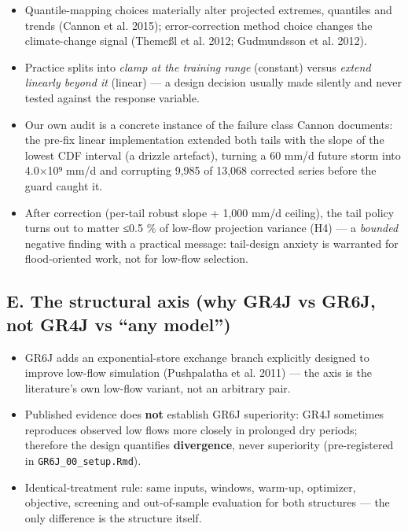 \documentclass[
  11pt,
]{article}
\providecommand{\tightlist}{%
  \setlength{\itemsep}{0pt}\setlength{\parskip}{0pt}}
\begin{document}
\begin{itemize}
\tightlist
\item
  Quantile-mapping choices materially alter projected extremes,
  quantiles and trends (Cannon et al. 2015); error-correction method
  choice changes the climate-change signal (Themeßl et al. 2012;
  Gudmundsson et al. 2012).
\item
  Practice splits into \emph{clamp at the training range} (constant)
  versus \emph{extend linearly beyond it} (linear) --- a design decision
  usually made silently and never tested against the response variable.
\item
  Our own audit is a concrete instance of the failure class Cannon
  documents: the pre-fix linear implementation extended both tails with
  the slope of the lowest CDF interval (a drizzle artefact), turning a
  60 mm/d future storm into 4.0×10⁹ mm/d and corrupting 9,985 of 13,068
  corrected series before the guard caught it.
\item
  After correction (per-tail robust slope + 1,000 mm/d ceiling), the
  tail policy turns out to matter ≤0.5 \% of low-flow projection
  variance (H4) --- a \emph{bounded} negative finding with a practical
  message: tail-design anxiety is warranted for flood-oriented work, not
  for low-flow selection.
\end{itemize}

\subsection{E. The structural axis (why GR4J vs GR6J, not GR4J vs ``any
model'')}\label{e.-the-structural-axis-why-gr4j-vs-gr6j-not-gr4j-vs-any-model}

\begin{itemize}
\tightlist
\item
  GR6J adds an exponential-store exchange branch explicitly designed to
  improve low-flow simulation (Pushpalatha et al. 2011) --- the axis is
  the literature's own low-flow variant, not an arbitrary pair.
\item
  Published evidence does \textbf{not} establish GR6J superiority: GR4J
  sometimes reproduces observed low flows more closely in prolonged dry
  periods; therefore the design quantifies \textbf{divergence}, never
  superiority (pre-registered in \texttt{GR6J\_00\_setup.Rmd}).
\item
  Identical-treatment rule: same inputs, windows, warm-up, optimizer,
  objective, screening and out-of-sample evaluation for both structures
  --- the only difference is the structure itself.
\end{itemize}
\end{document}
